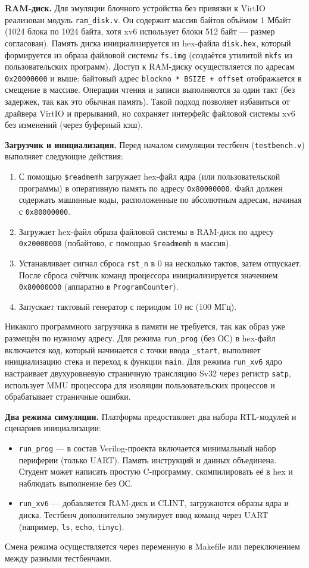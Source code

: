 \textbf{RAM‑диск.} Для эмуляции блочного устройства без привязки к VirtIO реализован модуль \texttt{ram\_disk.v}. Он содержит массив байтов объёмом 1 Мбайт (1024 блока по 1024 байта, хотя xv6 использует блоки 512 байт — размер согласован). Память диска инициализируется из hex-файла \texttt{disk.hex}, который формируется из образа файловой системы \texttt{fs.img} (создаётся утилитой \texttt{mkfs} из пользовательских программ). Доступ к RAM-диску осуществляется по адресам \texttt{0x20000000} и выше: байтовый адрес \texttt{blockno * BSIZE + offset} отображается в смещение в массиве. Операции чтения и записи выполняются за один такт (без задержек, так как это обычная память). Такой подход позволяет избавиться от драйвера VirtIO и прерываний, но сохраняет интерфейс файловой системы xv6 без изменений (через буферный кэш).

\textbf{Загрузчик и инициализация.} Перед началом симуляции тестбенч (\texttt{testbench.v}) выполняет следующие действия:
\begin{enumerate}
  \item С помощью \texttt{\$readmemh} загружает hex-файл ядра (или пользовательской программы) в оперативную память по адресу \texttt{0x80000000}. Файл должен содержать машинные коды, расположенные по абсолютным адресам, начиная с \texttt{0x80000000}.
  \item Загружает hex-файл образа файловой системы в RAM-диск по адресу \texttt{0x20000000} (побайтово, с помощью \texttt{\$readmemh} в массив).
  \item Устанавливает сигнал сброса \texttt{rst\_n} в 0 на несколько тактов, затем отпускает. После сброса счётчик команд процессора инициализируется значением \texttt{0x80000000} (аппаратно в \texttt{ProgramCounter}).
  \item Запускает тактовый генератор с периодом 10 нс (100 МГц).
\end{enumerate}
Никакого программного загрузчика в памяти не требуется, так как образ уже размещён по нужному адресу. Для режима \texttt{run\_prog} (без ОС) в hex-файл включается код, который начинается с точки ввода \texttt{\_start}, выполняет инициализацию стека и переход к функции \texttt{main}. Для режима \texttt{run\_xv6} ядро настраивает двухуровневую страничную трансляцию Sv32 через регистр \texttt{satp}, использует MMU процессора для изоляции пользовательских процессов и обрабатывает страничные ошибки.

\textbf{Два режима симуляции.} Платформа предоставляет два набора RTL-модулей и сценариев инициализации:
\begin{itemize}
  \item \texttt{run\_prog} — в состав Verilog-проекта включается минимальный набор периферии (только UART). Память инструкций и данных объединена. Студент может написать простую C-программу, скомпилировать её в hex и наблюдать выполнение без ОС.
  \item \texttt{run\_xv6} — добавляется RAM-диск и CLINT, загружаются образы ядра и диска. Тестбенч дополнительно эмулирует ввод команд через UART (например, \texttt{ls}, \texttt{echo}, \texttt{tinyc}).
\end{itemize}
Смена режима осуществляется через переменную в Makefile или переключением между разными тестбенчами.


